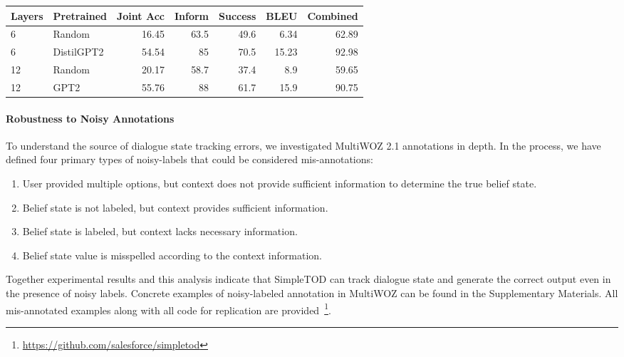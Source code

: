\documentclass{article}
\begin{document}
\begin{table*}[t]
\centering
\small
\begin{tabular}{llrrrrr}
\hline
Layers & Pretrained & Joint Acc & Inform& Success& BLEU & Combined\\
\hline
 6& Random  & 16.45 & 63.5 & 49.6 & 6.34 & 62.89 \\
6& DistilGPT2  & 54.54 & 85 & 70.5 & 15.23  & 92.98 \\
12& Random & 20.17 & 58.7 & 37.4 & 8.9 & 59.65 \\
12 & GPT2 & 55.76  & 88 & 61.7 & 15.9 & 90.75 \\
\hline
\end{tabular}
\caption{Ablations  on MultiWOZ 2.1 comparing the importance of pretraining. Recasting as single sequence prediction enables fully leveraging pre-trained models for the language understanding they have gathered in an open-domain setting. }
\label{tab:pretraining-ablation}
\end{table*}


\paragraph{Robustness to Noisy Annotations}
To understand the source of dialogue state tracking errors, 
we investigated MultiWOZ 2.1 annotations in depth.
In the process, 
we have defined four primary types of noisy-labels that could be considered mis-annotations:
\begin{enumerate}
    \item User provided multiple options, but context does not provide sufficient information to determine the true belief state.
    \item Belief state is not labeled, but context provides sufficient information.
    \item Belief state is labeled, but context lacks necessary information.
    \item Belief state value is misspelled according to the context information.
\end{enumerate}


Together experimental results and this analysis indicate that SimpleTOD can track dialogue state and generate the correct output even in the presence of noisy labels.
Concrete examples of noisy-labeled annotation in MultiWOZ can be found in the Supplementary Materials.
All mis-annotated examples along with all code for replication are  provided~\footnote{\url{https://github.com/salesforce/simpletod}}. 
\end{document}
